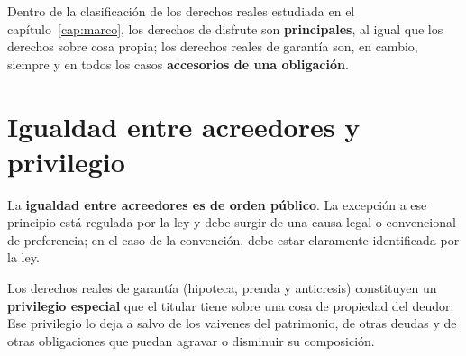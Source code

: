 \documentclass[12pt,oneside]{book}
\begin{document}
Dentro de la clasificación de los derechos reales estudiada en el capítulo~\ref{cap:marco}, los derechos de disfrute son \textbf{principales}, al igual que los derechos sobre cosa propia; los derechos reales de garantía son, en cambio, siempre y en todos los casos \textbf{accesorios de una obligación}.

\section{Igualdad entre acreedores y privilegio}

La \textbf{igualdad entre acreedores es de orden público}. La excepción a ese principio está regulada por la ley y debe surgir de una causa legal o convencional de preferencia; en el caso de la convención, debe estar claramente identificada por la ley.

Los derechos reales de garantía (hipoteca, prenda y anticresis) constituyen un \textbf{privilegio especial} que el titular tiene sobre una cosa de propiedad del deudor. Ese privilegio lo deja a salvo de los vaivenes del patrimonio, de otras deudas y de otras obligaciones que puedan agravar o disminuir su composición.
\end{document}
